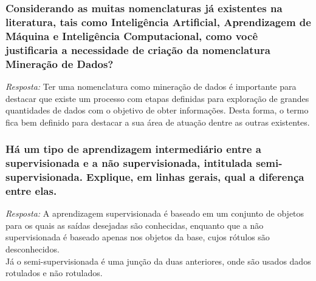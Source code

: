\documentclass{article}
\begin{document}
\subsubsection{Considerando as muitas nomenclaturas já existentes na literatura, tais como Inteligência Artificial, Aprendizagem de Máquina e Inteligência Computacional, como você justificaria a necessidade de criação da nomenclatura Mineração de Dados?}
\textit{Resposta:} Ter uma nomenclatura como mineração de dados é importante para destacar que existe um processo com etapas definidas para exploração de grandes quantidades de dados com o objetivo de obter informações. Desta forma, o termo fica bem definido para destacar a sua área de atuação dentre as outras existentes.


\subsubsection{Há um tipo de aprendizagem intermediário entre a supervisionada e a não supervisionada, intitulada semi-supervisionada. Explique, em linhas gerais, qual a diferença entre elas.}
\textit{Resposta:} A aprendizagem supervisionada é baseado em um conjunto de objetos para os quais as saídas desejadas são conhecidas, enquanto que a não supervisionada é baseado apenas nos objetos da base, cujos rótulos são desconhecidos. \\
Já o semi-supervisionada é uma junção da duas anteriores, onde são usados dados rotulados e não rotulados.
\end{document}
